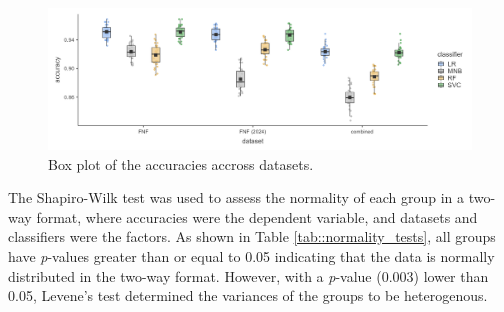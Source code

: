 
\begin{figure}[ht]
    \centering
    \includegraphics[width=\textwidth,height=\textheight, keepaspectratio]{figures/stats/box_plot.png}
        \caption{Box plot of the accuracies accross datasets.}
        \label{fig:box_plot_accuracy}
\end{figure}

The Shapiro-Wilk test was used to assess the normality of each group in a two-way format, where accuracies were the dependent variable, and datasets and classifiers were the factors. As shown in Table \ref{tab::normality_tests}, all groups have \textit{p}-values greater than or equal to 0.05 indicating that the data is normally distributed in the two-way format. However, with a \textit{p}-value (0.003) lower than 0.05, Levene's test determined the variances of the groups to be heterogenous.

